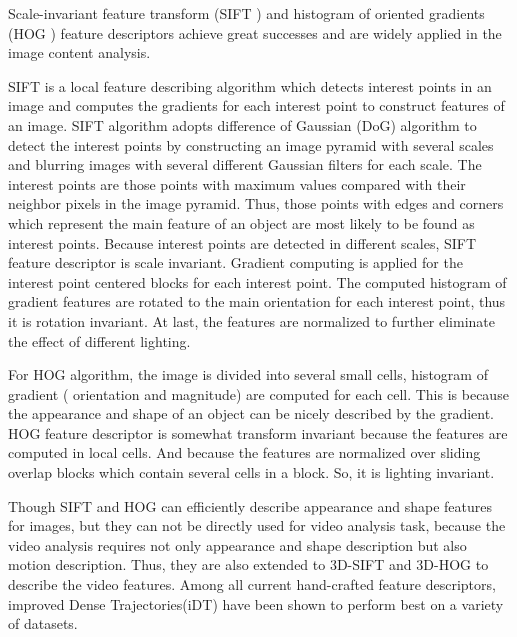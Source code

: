 Scale-invariant feature transform (SIFT \cite{lowe1999} \cite{lowe2004})  and histogram of oriented gradients (HOG \cite{hog}) feature descriptors achieve great successes and are widely applied in the image content analysis. 
\par 
SIFT is a local feature describing algorithm which detects interest points in an image and computes the gradients for each interest point to construct features of an image. SIFT algorithm adopts difference of Gaussian (DoG) algorithm to detect the interest points by constructing an image pyramid with several scales and blurring images with several different Gaussian filters for each scale. The interest points are those points with maximum values compared with their neighbor pixels in the image pyramid. Thus, those points with edges and corners which represent the main feature of an object are most likely to be found as interest points. Because interest points are detected in different scales, SIFT feature descriptor is scale invariant.  Gradient computing is applied for the interest point centered blocks for each interest point. The computed histogram of gradient features are rotated to the main orientation for each interest point, thus it is rotation invariant. At last, the features are normalized to further eliminate the effect of different lighting.
\par 
For HOG algorithm, the image is divided into several small cells, histogram of gradient ( orientation and magnitude) are computed for each cell. This is because the appearance and shape of an object can be nicely described by the gradient. HOG feature descriptor is somewhat transform invariant because the features are computed in local cells. And because the features are normalized over sliding overlap blocks which contain several cells in a block. So, it is lighting invariant.
\par
Though SIFT and HOG can efficiently describe appearance and shape features for images, but they can not be directly used for video analysis task, because the video analysis requires not only appearance and shape description but also motion description. Thus, they are also extended to 3D-SIFT\cite{grepory2010} \cite{paul2007} and 3D-HOG\cite{alex2008} to describe the video features. Among all current hand-crafted feature descriptors, improved Dense Trajectories(iDT)\cite{wang2012}\cite{wang2013} have been shown to perform best on a variety of datasets. 


